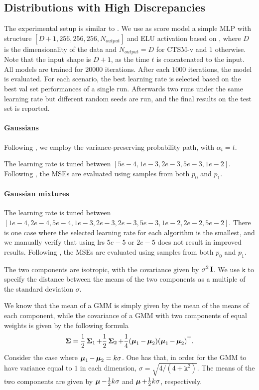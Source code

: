 \subsection{Distributions with High Discrepancies}
\label{app:sec:exp1}

The experimental setup is similar to \citet{choi2022densityratio}. We use as score model a simple MLP with structure $[D+1, 256, 256, 256, N_{output}]$ and ELU activation \citep{clevert2016fast} based on \citet{choi2022densityratio}, where $D$ is the dimensionality of the data and $N_{output}=D$ for CTSM-v and $1$ otherwise. Note that the input shape is $D+1$, as the time $t$ is concatenated to the input. All models are trained for $20000$ iterations. After each $1000$ iterations, the model is evaluated. For each scenario, the best learning rate is selected based on the best val set performances of a single run. Afterwards two runs under the same learning rate but different random seeds are run, and the final results on the test set is reported.

\paragraph{Gaussians}

Following \citet{choi2022densityratio}, we employ the variance-preserving probability path, with $\alpha_{t}=t$.

The learning rate is tuned between $[5e-4, 1e-3, 2e-3, 5e-3, 1e-2]$. Following \citet{choi2022densityratio}, the MSEs are evaluated using samples from both $p_{0}$ and $p_{1}$.

\paragraph{Gaussian mixtures}

The learning rate is tuned between $[1e-4, 2e-4, 5e-4, 1e-3, 2e-3, 2e-3, 5e-3, 1e-2, 2e-2, 5e-2]$. There is one case where the selected learning rate for each algorithm is the smallest, and we manually verify that using lrs $5e-5$ or $2e-5$ does not result in improved results. Following \citet{choi2022densityratio}, the MSEs are evaluated using samples from both $p_{0}$ and $p_{1}$.

The two components are isotropic, with the covariance given by $\sigma^{2}\operatorname{\mathbf{I}}$. We use $\texttt{k}$ to specify the distance between the means of the two components as a multiple of the standard deviation $\sigma$.

We know that the mean of a GMM is simply given by the mean of the means of each component, while the covariance of a GMM with two components of equal weights is given by the following formula
\begin{align}
\operatorname{\mathbf{\Sigma}} = \frac{1}{2} \operatorname{\mathbf{\Sigma}}_{1} + \frac{1}{2} \operatorname{\mathbf{\Sigma}}_{2} + \frac{1}{4} (\operatorname{\bm{\mu}}_{1}-\operatorname{\bm{\mu}}_{2})(\operatorname{\bm{\mu}}_{1}-\operatorname{\bm{\mu}}_{2})^{\top}.
\end{align}
Consider the case where $\operatorname{\bm{\mu}}_{1}-\operatorname{\bm{\mu}}_{2} = k\sigma$. One has that, in order for the GMM to have variance equal to $1$ in each dimension, $\sigma=\sqrt{4 / (4+\texttt{k}^{2})}$. The means of the two components are given by $\operatorname{\bm{\mu}}-\frac{1}{2} k \sigma$ and $\operatorname{\bm{\mu}}+\frac{1}{2} k \sigma$, respectively.

